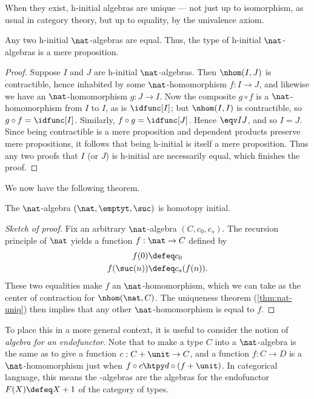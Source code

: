 When they exist, h-initial algebras are unique --- not just up to isomorphism, as usual in category theory, but up to equality, by the univalence axiom.

\begin{thm}
  Any two h-initial $\nat$-algebras are equal.
  Thus, the type of h-initial $\nat$-algebras is a mere proposition.
\end{thm}
\begin{proof}
  Suppose $I$ and $J$ are h-initial $\nat$-algebras.
  Then $\nhom(I,J)$ is contractible, hence inhabited by some $\nat$-homomorphism $f:I\to J$, and likewise we have an $\nat$-homomorphism $g:J\to I$.
  Now the composite $g\circ f$ is a $\nat$-homomorphism from $I$ to $I$, as is $\idfunc[I]$; but $\nhom(I,I)$ is contractible, so $g\circ f = \idfunc[I]$.
  Similarly, $f\circ g = \idfunc[J]$.
  Hence $\eqv IJ$, and so $I=J$. Since being contractible is a mere proposition and dependent products preserve mere propositions, it follows that being h-initial is itself a mere proposition. Thus any two proofs that $I$ (or $J$) is h-initial are necessarily equal, which finishes the proof.
\end{proof}

We now have the following theorem.

\begin{thm}\label{thm:nat-hinitial}
The $\nat$-algebra $(\nat, \emptyt, \suc)$ is homotopy initial.
\end{thm}
\begin{proof}[Sketch of proof]
  Fix an arbitrary $\nat$-algebra $(C,c_0,c_s)$.
  The recursion principle of $\nat$ yields a function $f:\nat\to C$ defined by
  \begin{align*}
    f(0) &\defeq c_0\\
    f(\suc(n)) &\defeq c_s(f(n)).
  \end{align*}
  These two equalities make $f$ an $\nat$-homomorphism, which we can take as the center of contraction for $\nhom(\nat,C)$.
  The uniqueness theorem (\autoref{thm:nat-uniq}) then implies that any other $\nat$-homomorphism is equal to $f$.
\end{proof}

To place this in a more general context, it is useful to consider the notion of \emph{algebra for an endofunctor}. 
Note that to make a type $C$ into a $\nat$-algebra is the same as to give a function $c:C+\unit\to C$, and a function $f:C\to D$ is a $\nat$-homomorphism just when $f \circ c \htpy d \circ (f+\unit)$.
In categorical language, this means the \nat-algebras are the algebras for the endofunctor $F(X)\defeq X+1$ of the category of types.

